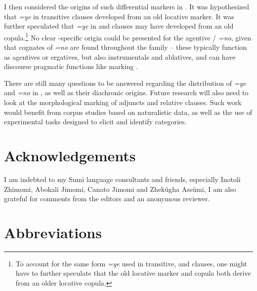 \documentclass[output=paper]{LSP/langsci}
\begin{document}
I then considered the origins of such differential markers in . It was hypothesized that \textit{=ye} in transitive clauses developed from an old locative marker. It was further speculated that \textit{=ye} in  and  clauses may have developed from an old copula.\footnote{To account for the same form \textit{=ye} used in transitive,  and  clauses, one might have to further speculate that the old locative marker and  copula both derive from an older locative copula.} No clear -specific origin could be presented for the agentive /  \textit{=no}, given that cognates of \textit{=no} are found throughout the  family – these typically function as agentives or ergatives, but also instrumentals and ablatives, and can have discourse pragmatic functions like marking .

There are still many questions to be answered regarding the distribution of \textit{=ye} and \textit{=no} in , as well as their diachronic origins. Future research will also need to look at the morphological marking of adjuncts and relative clauses. Such work would benefit from corpus studies based on naturalistic data, as well as the use of experimental tasks designed to elicit and identify  categories. 

\section*{Acknowledgements}
I am indebted to my Sumi language consultants and friends, especially Inotoli Zhimomi, Abokali Jimomi, Canato Jimomi and Zhekügha Assümi, I am also grateful for comments from the editors and an anonymous reviewer.


\section*{Abbreviations}
\end{document}
